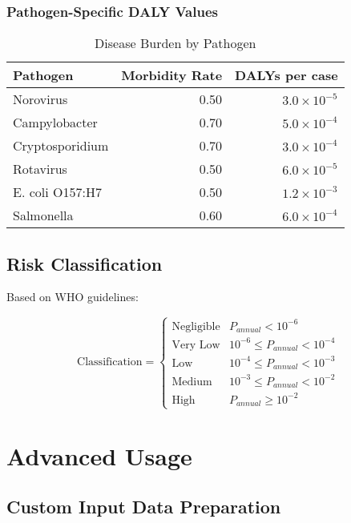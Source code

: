 \documentclass[11pt,a4paper]{article}
\begin{document}
\subsubsection{Pathogen-Specific DALY Values}

\begin{table}[H]
\centering
\caption{Disease Burden by Pathogen}
\begin{tabular}{lrr}
\toprule
\textbf{Pathogen} & \textbf{Morbidity Rate} & \textbf{DALYs per case} \\
\midrule
Norovirus & 0.50 & $3.0 \times 10^{-5}$ \\
Campylobacter & 0.70 & $5.0 \times 10^{-4}$ \\
Cryptosporidium & 0.70 & $3.0 \times 10^{-4}$ \\
Rotavirus & 0.50 & $6.0 \times 10^{-5}$ \\
E. coli O157:H7 & 0.50 & $1.2 \times 10^{-3}$ \\
Salmonella & 0.60 & $6.0 \times 10^{-4}$ \\
\bottomrule
\end{tabular}
\end{table}

\subsection{Risk Classification}

Based on WHO guidelines:

\begin{equation}
\text{Classification} =
\begin{cases}
\text{Negligible} & P_{annual} < 10^{-6} \\
\text{Very Low} & 10^{-6} \le P_{annual} < 10^{-4} \\
\text{Low} & 10^{-4} \le P_{annual} < 10^{-3} \\
\text{Medium} & 10^{-3} \le P_{annual} < 10^{-2} \\
\text{High} & P_{annual} \ge 10^{-2}
\end{cases}
\end{equation}

\newpage

\section{Advanced Usage}

\subsection{Custom Input Data Preparation}
\end{document}
